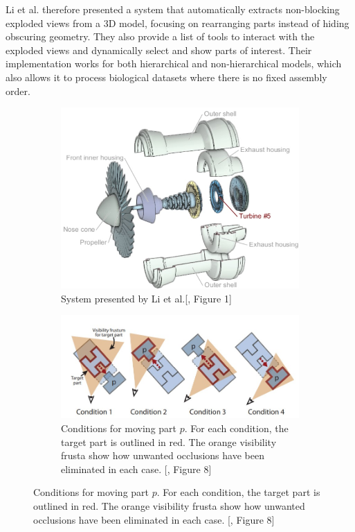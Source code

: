 Li et al. therefore presented a system that automatically extracts non-blocking exploded views from a 3D model, focusing on rearranging parts instead of hiding obscuring geometry.\cite{Wilmot_Li_2008}
They also provide a list of tools to interact with the exploded views and dynamically select and show parts of interest.
Their implementation works for both hierarchical and non-hierarchical models, which also allows it to process biological datasets where there is no fixed assembly order.
\begin{figure}
	\centering
	\normalsize
	\begin{subfigure}[t]{0.49\textwidth}
		\centering
		\includegraphics[width=.95\linewidth]{fig/Images/AutomatedGenerationofInteractive3DExplodedViewDiagrams_Li2008_fig1}
		\caption[]{System presented by Li et al.[\cite{Wilmot_Li_2008}, Figure 1]}
		
	\end{subfigure}
	\smallskip
	\begin{subfigure}[t]{0.5\textwidth}
		\centering
		\includegraphics[width=1.1\linewidth]{fig/Images/AutomatedGenerationofInteractive3DExplodedViewDiagrams_Li2008_fig8}
		\caption[]{Conditions for moving part $p$. For each condition, the target part is outlined in red. The orange visibility frusta show how unwanted occlusions have been eliminated in each case. [\cite{Wilmot_Li_2008}, Figure 8]}
	\end{subfigure}
\end{figure}
